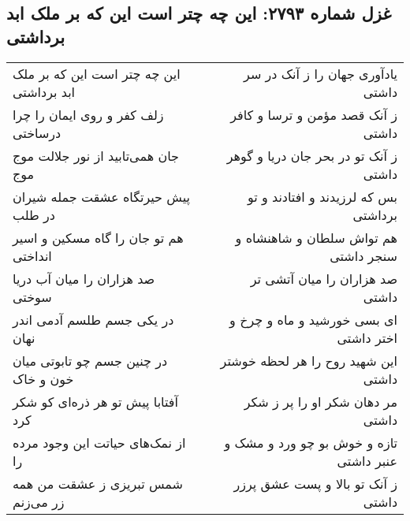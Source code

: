 \begin{center}
\section*{غزل شماره ۲۷۹۳: این چه چتر است این که بر ملک ابد برداشتی}
\label{sec:2793}
\begin{longtable}{l p{0.5cm} r}
این چه چتر است این که بر ملک ابد برداشتی
&&
یادآوری جهان را ز آنک در سر داشتی
\\
زلف کفر و روی ایمان را چرا درساختی
&&
ز آنک قصد مؤمن و ترسا و کافر داشتی
\\
جان همی‌تابید از نور جلالت موج موج
&&
ز آنک تو در بحر جان دریا و گوهر داشتی
\\
پیش حیرتگاه عشقت جمله شیران در طلب
&&
بس که لرزیدند و افتادند و تو برداشتی
\\
هم تو جان را گاه مسکین و اسیر انداختی
&&
هم تواش سلطان و شاهنشاه و سنجر داشتی
\\
صد هزاران را میان آب دریا سوختی
&&
صد هزاران را میان آتشی تر داشتی
\\
در یکی جسم طلسم آدمی اندر نهان
&&
ای بسی خورشید و ماه و چرخ و اختر داشتی
\\
در چنین جسم چو تابوتی میان خون و خاک
&&
این شهید روح را هر لحظه خوشتر داشتی
\\
آفتابا پیش تو هر ذره‌ای کو شکر کرد
&&
مر دهان شکر او را پر ز شکر داشتی
\\
از نمک‌های حیاتت این وجود مرده را
&&
تازه و خوش بو چو ورد و مشک و عنبر داشتی
\\
شمس تبریزی ز عشقت من همه زر می‌زنم
&&
ز آنک تو بالا و پست عشق پرزر داشتی
\\
\end{longtable}
\end{center}
